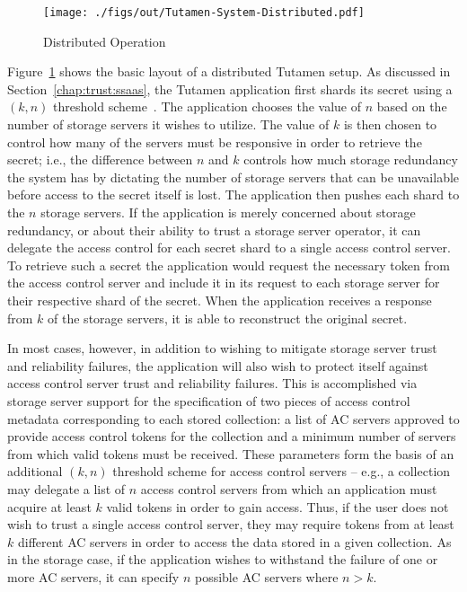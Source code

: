 \begin{figure}[t]
  \centering
  \texttt{[image: ./figs/out/Tutamen-System-Distributed.pdf]}
  \caption{Distributed Operation}
  \label{fig:tutamen:systemdistributed}
\end{figure}

Figure~\ref{fig:tutamen:systemdistributed} shows the basic layout of a
distributed Tutamen setup. As discussed in
Section~\ref{chap:trust:ssaas}, the Tutamen application first shards
its secret using a $(k, n)$ threshold scheme~\cite{krawczyk1993,
  shamir1979}. The application chooses the value of $n$ based on the
number of storage servers it wishes to utilize. The value of $k$ is
then chosen to control how many of the servers must be responsive in
order to retrieve the secret; i.e., the difference between $n$ and $k$
controls how much storage redundancy the system has by dictating the
number of storage servers that can be unavailable before access to the
secret itself is lost. The application then pushes each shard to the
$n$ storage servers. If the application is merely concerned about
storage redundancy, or about their ability to trust a storage server
operator, it can delegate the access control for each secret shard to
a single access control server. To retrieve such a secret the
application would request the necessary token from the access control
server and include it in its request to each storage server for their
respective shard of the secret. When the application receives a
response from $k$ of the storage servers, it is able to reconstruct
the original secret.

In most cases, however, in addition to wishing to mitigate storage
server trust and reliability failures, the application will also wish
to protect itself against access control server trust and reliability
failures. This is accomplished via storage server support for the
specification of two pieces of access control metadata corresponding
to each stored collection: a list of AC servers approved to provide
access control tokens for the collection and a minimum number of
servers from which valid tokens must be received. These parameters
form the basis of an additional $(k, n)$ threshold scheme for access
control servers -- e.g., a collection may delegate a list of $n$
access control servers from which an application must acquire at least
$k$ valid tokens in order to gain access. Thus, if the user does not
wish to trust a single access control server, they may require tokens
from at least $k$ different AC servers in order to access the data
stored in a given collection. As in the storage case, if the
application wishes to withstand the failure of one or more AC servers,
it can specify $n$ possible AC servers where $n > k$.

